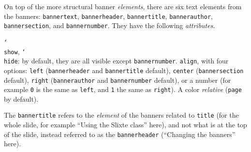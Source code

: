 \documentclass{slixte}
\newcommand{\codetext}[1]{\texttt{\color{second}#1}}
\newcommand{\cmdt}[1]{\char`\\#1}
\newcommand{\cbrl}{\char`\{}
\newcommand{\cbrr}{\char`\}}
\newcommand{\cbrt}[1]{\cbrl#1\cbrr}
\newcommand{\codeline}[2][0]{\spacing[0.1]\hspace{-1.2cm}\codetext{\foreach\i in {0,...,#1}{~~~~}#2}\par}
\newcommand{\sptm}[1]{\textit{\color{third}#1}}
\begin{document}
\begin{slide}
    On top of the more structural banner \sptm{elements}, there are six text elements from the banners: \codetext{bannertext}, \codetext{bannerheader}, \codetext{bannertitle}, \codetext{bannerauthor}, \codetext{bannersection}, and \codetext{bannernumber}.
    They have the following \sptm{attributes}.
    \begin{itemize}
        \fillitem \codetext{\cmdt{show}}, \codetext{\cmdt{hide}}: by default, they are all visible except \codetext{bannernumber}.
        \fillitem \codetext{align}, with four options: \codetext{left} (\codetext{bannerheader} and \codetext{bannertitle} default), \codetext{center} (\codetext{bannersection} default), \codetext{right} (\codetext{bannerauthor} and \codetext{bannernumber} default), or a number (for example \codetext{0} is the same as \codetext{left}, and \codetext{1} the same as \codetext{right}).
        \fillitem A color \sptm{relative} (\codetext{page} by default).
    \end{itemize}
    \spacing
    \begin{alert}
        The \codetext{bannertitle} refers to the \sptm{element} of the banners related to \codetext{title} (for the whole slide, for example ``Using the Slixte class'' here), and not what is at the top of the slide, instead referred to as the \codetext{bannerheader} (``Changing the banners'' here).
    \end{alert}
\end{slide}

\iftoggle{examples}{
\begin{slide}[Changing the banners (example)]
    Try the following code in your document.

    \spacing
    
    \codeline{\cmdt{def}\cmdt{banneropacity}\cbrt{1}}
    \codeline{\cmdt{def}\cmdt{topbannerheight}\cbrt{0.5\cmdt{paperheight}}}
    \codeline{\cmdt{setfontsizetopbanner}\cbrt{2cm}}
    \codeline{\cmdt{colorlet}\cbrt{bottombanner}\cbrt{second}}
    \codeline{\cmdt{def}\cmdt{bottombannery}\cbrt{1cm}}
    \codeline{\cmdt{def}\cmdt{bannerheaderalign}\cbrt{right}}
    \codeline{\cmdt{showbannernumber}}
    \codeline{\cmdt{def}\cmdt{bannernumberalign}\cbrt{0.75}}
    \codeline{\cmdt{begin}\cbrt{slide}[The bannerheader element]\cmdt{end}\cbrt{slide}}
\end{slide}
}{}
\end{document}
